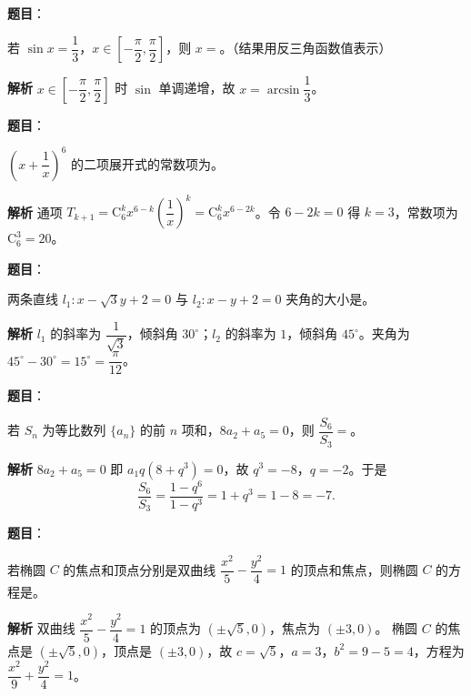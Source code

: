 \begin{answer}

\textbf{题目}：

若 $\sin x=\dfrac13$，$x\in\left[-\dfrac\pi2,\dfrac\pi2\right]$，则 $x=$\gkblank{}。（结果用反三角函数值表示）

\textbf{解析}
$x\in\left[-\dfrac\pi2,\dfrac\pi2\right]$ 时 $\sin$ 单调递增，故 $x=\arcsin\dfrac13$。


\end{answer}
\begin{answer}

\textbf{题目}：

$\left(x+\dfrac1x\right)^6$ 的二项展开式的常数项为\gkblank{}。

\textbf{解析}
通项 $T_{k+1}=\mathrm C_6^kx^{6-k}\left(\dfrac1x\right)^k=\mathrm C_6^kx^{6-2k}$。令 $6-2k=0$ 得 $k=3$，常数项为 $\mathrm C_6^3=20$。


\end{answer}
\begin{answer}

\textbf{题目}：

两条直线 $l_1:x-\sqrt3y+2=0$ 与 $l_2:x-y+2=0$ 夹角的大小是\gkblank{}。

\textbf{解析}
$l_1$ 的斜率为 $\dfrac1{\sqrt3}$，倾斜角 $30^\circ$；$l_2$ 的斜率为 $1$，倾斜角 $45^\circ$。夹角为 $45^\circ-30^\circ=15^\circ=\dfrac\pi{12}$。


\end{answer}
\begin{answer}

\textbf{题目}：

若 $S_n$ 为等比数列 $\{a_n\}$ 的前 $n$ 项和，$8a_2+a_5=0$，则 $\dfrac{S_6}{S_3}=$\gkblank{}。

\textbf{解析}
$8a_2+a_5=0$ 即 $a_1q(8+q^3)=0$，故 $q^3=-8$，$q=-2$。于是
\nopagebreak[4]
\[\frac{S_6}{S_3}=\frac{1-q^6}{1-q^3}=1+q^3=1-8=-7.\]


\end{answer}
\begin{answer}

\textbf{题目}：

若椭圆 $C$ 的焦点和顶点分别是双曲线 $\dfrac{x^2}{5}-\dfrac{y^2}{4}=1$ 的顶点和焦点，则椭圆 $C$ 的方程是\gkblank{}。

\textbf{解析}
双曲线 $\dfrac{x^2}5-\dfrac{y^2}4=1$ 的顶点为 $(\pm\sqrt5,0)$，焦点为 $(\pm3,0)$。
椭圆 $C$ 的焦点是 $(\pm\sqrt5,0)$，顶点是 $(\pm3,0)$，故 $c=\sqrt5$，$a=3$，$b^2=9-5=4$，方程为 $\dfrac{x^2}9+\dfrac{y^2}4=1$。


\end{answer}

